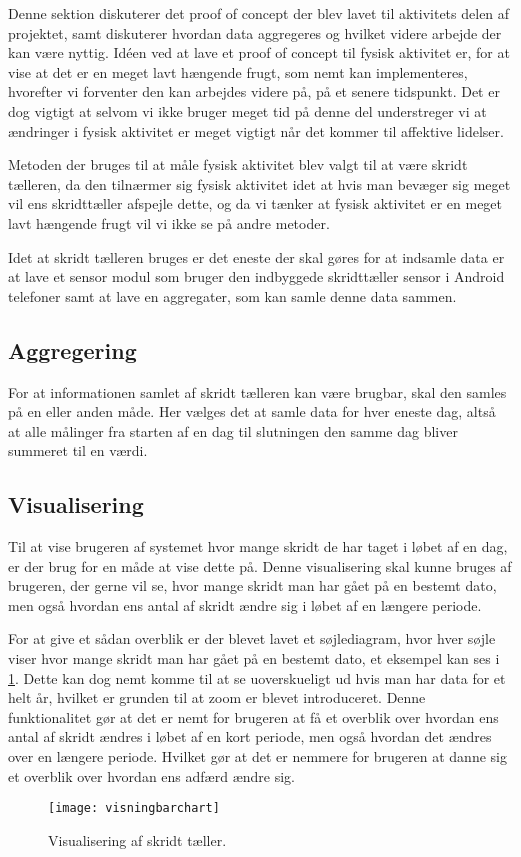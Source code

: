 Denne sektion diskuterer det proof of concept der blev lavet til aktivitets delen af projektet, samt diskuterer hvordan data aggregeres og hvilket videre arbejde der kan være nyttig. 
Idéen ved at lave et proof of concept til fysisk aktivitet er, for at vise at det er en meget lavt hængende frugt, som nemt kan implementeres, hvorefter vi forventer den kan arbejdes videre på, på et senere tidspunkt. 
Det er dog vigtigt at selvom vi ikke bruger meget tid på denne del understreger vi at ændringer i fysisk aktivitet er meget vigtigt når det kommer til affektive lidelser. 

Metoden der bruges til at måle fysisk aktivitet blev valgt til at være skridt tælleren, da den tilnærmer sig fysisk aktivitet idet at hvis man bevæger sig meget vil ens skridttæller afspejle dette, og da vi tænker at fysisk aktivitet er en meget lavt hængende frugt vil vi ikke se på andre metoder.

Idet at skridt tælleren bruges er det eneste der skal gøres for at indsamle data er at lave et sensor modul som bruger den indbyggede skridttæller sensor i Android telefoner samt at lave en aggregater, som kan samle denne data sammen. 

\subsection{Aggregering}
For at informationen samlet af skridt tælleren kan være brugbar, skal den samles på en eller anden måde.
Her vælges det at samle data for hver eneste dag, altså at alle målinger fra starten af en dag til slutningen den samme dag bliver summeret til en værdi.

\subsection{Visualisering}
Til at vise brugeren af systemet hvor mange skridt de har taget i løbet af en dag, er der brug for en måde at vise dette på.
Denne visualisering skal kunne bruges af brugeren, der gerne vil se, hvor mange skridt man har gået på en bestemt dato, men også hvordan ens antal af skridt ændre sig i løbet af en længere periode.

For at give et sådan overblik er der blevet lavet et søjlediagram, hvor hver søjle viser hvor mange skridt man har gået på en bestemt dato, et eksempel kan ses i \cref{fig:skridttaeller}.
Dette kan dog nemt komme til at se uoverskueligt ud hvis man har data for et helt år, hvilket er grunden til at zoom er blevet introduceret.
Denne funktionalitet gør at det er nemt for brugeren at få et overblik over hvordan ens antal af skridt ændres i løbet af en kort periode, men også hvordan det ændres over en længere periode.
Hvilket gør at det er nemmere for brugeren at danne sig et overblik over hvordan ens adfærd ændre sig.

\begin{figure}[h]
	\centering
	\texttt{[image: visningbarchart]}
	\caption{Visualisering af skridt tæller.}
	\label{fig:skridttaeller}
\end{figure}